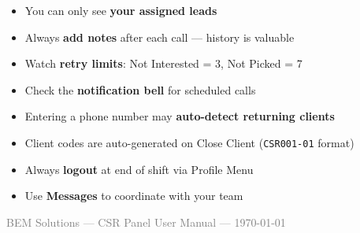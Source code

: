 \documentclass[11pt,a4paper]{article}
\begin{document}
\begin{tipbox}
\begin{itemize}
    \item You can only see \textbf{your assigned leads}
    \item Always \textbf{add notes} after each call --- history is valuable
    \item Watch \textbf{retry limits}: Not Interested = 3, Not Picked = 7
    \item Check the \textbf{notification bell} for scheduled calls
    \item Entering a phone number may \textbf{auto-detect returning clients}
    \item Client codes are auto-generated on Close Client (\texttt{CSR001-01} format)
    \item Always \textbf{logout} at end of shift via Profile Menu
    \item Use \textbf{Messages} to coordinate with your team
\end{itemize}
\end{tipbox}

\vfill
\begin{center}
    \small
    \textcolor{gray}{BEM Solutions --- CSR Panel User Manual --- \today}
\end{center}
\end{document}
